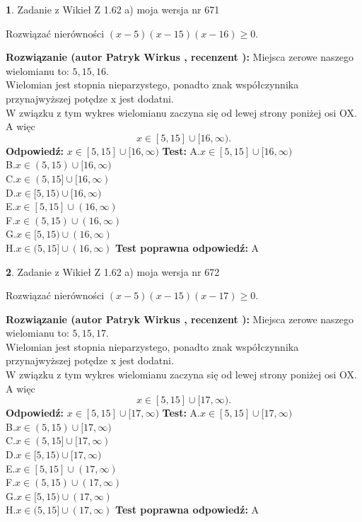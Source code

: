 \documentclass[12pt, a4paper]{article}
\theoremstyle{definition} %
\newtheorem{zad}{}
\newcommand{\zadStart}[1]{\begin{zad}#1\newline}
\newcommand{\zadStop}{\end{zad}}
\newcommand{\rozwStart}[2]{\noindent \textbf{Rozwiązanie (autor #1 , recenzent #2): }\newline}
\newcommand{\rozwStop}{\newline}
\newcommand{\odpStart}{\noindent \textbf{Odpowiedź:}\newline}
\newcommand{\odpStop}{\newline}
\newcommand{\testStart}{\noindent \textbf{Test:}\newline}
\newcommand{\testStop}{\newline}
\newcommand{\kluczStart}{\noindent \textbf{Test poprawna odpowiedź:}\newline}
\newcommand{\kluczStop}{\newline}
\begin{document}
\zadStart{Zadanie z Wikieł Z 1.62 a) moja wersja nr 671}

Rozwiązać nierówności $(x-5)(x-15)(x-16)\ge0$.
\zadStop
\rozwStart{Patryk Wirkus}{}
Miejsca zerowe naszego wielomianu to: $5, 15, 16$.\\
Wielomian jest stopnia nieparzystego, ponadto znak współczynnika przy\linebreak najwyższej potędze x jest dodatni.\\ W związku z tym wykres wielomianu zaczyna się od lewej strony poniżej osi OX. A więc $$x \in [5,15] \cup [16,\infty).$$
\rozwStop
\odpStart
$x \in [5,15] \cup [16,\infty)$
\odpStop
\testStart
A.$x \in [5,15] \cup [16,\infty)$\\
B.$x \in (5,15) \cup [16,\infty)$\\
C.$x \in (5,15] \cup [16,\infty)$\\
D.$x \in [5,15) \cup [16,\infty)$\\
E.$x \in [5,15] \cup (16,\infty)$\\
F.$x \in (5,15) \cup (16,\infty)$\\
G.$x \in [5,15) \cup (16,\infty)$\\
H.$x \in (5,15] \cup (16,\infty)$
\testStop
\kluczStart
A
\kluczStop



\zadStart{Zadanie z Wikieł Z 1.62 a) moja wersja nr 672}

Rozwiązać nierówności $(x-5)(x-15)(x-17)\ge0$.
\zadStop
\rozwStart{Patryk Wirkus}{}
Miejsca zerowe naszego wielomianu to: $5, 15, 17$.\\
Wielomian jest stopnia nieparzystego, ponadto znak współczynnika przy\linebreak najwyższej potędze x jest dodatni.\\ W związku z tym wykres wielomianu zaczyna się od lewej strony poniżej osi OX. A więc $$x \in [5,15] \cup [17,\infty).$$
\rozwStop
\odpStart
$x \in [5,15] \cup [17,\infty)$
\odpStop
\testStart
A.$x \in [5,15] \cup [17,\infty)$\\
B.$x \in (5,15) \cup [17,\infty)$\\
C.$x \in (5,15] \cup [17,\infty)$\\
D.$x \in [5,15) \cup [17,\infty)$\\
E.$x \in [5,15] \cup (17,\infty)$\\
F.$x \in (5,15) \cup (17,\infty)$\\
G.$x \in [5,15) \cup (17,\infty)$\\
H.$x \in (5,15] \cup (17,\infty)$
\testStop
\kluczStart
A
\kluczStop
\end{document}

